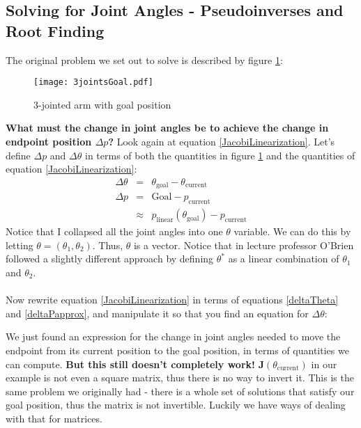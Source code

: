 \documentclass[]{article}
\begin{document}
\subsection{Solving for Joint Angles - Pseudoinverses and Root Finding}
The original problem we set out to solve is described by figure \ref{3jointarmGoal}:
\begin{figure}[htp]
    \centering
        \texttt{[image: 3jointsGoal.pdf]}
        \label{3jointarmGoal}
    \caption{3-jointed arm with goal position}
\end{figure}

\textbf{What must the change in joint angles be to achieve the change in endpoint position $\Delta p$?}
Look again at equation \ref{JacobiLinearization}. Let's define $\Delta p$ and $\Delta \theta$ in terms of both the quantities in figure \ref{3jointarmGoal} and the quantities of equation \ref{JacobiLinearization}:
\begin{eqnarray}
    \Delta \theta & = & \theta_{\text{goal}} - \theta_{\text{current}} \label{deltaTheta}\\ 
    \Delta p & = & \text{Goal} - p_\text{current} \label{deltaP}\\
     & \approx & p_{\text{linear}}(\theta_{\text{goal}}) - p_{\text{current}} \label{deltaPapprox}
\end{eqnarray}
Notice that I collapsed all the joint angles into one $\theta$ variable. We can do this by letting $\theta = \left( \theta_1, \theta_2\right)$. Thus, $\theta$ is a vector. Notice that in lecture professor O'Brien followed a slightly different approach by defining $\theta^*$ as a linear combination of $\theta_1$ and $\theta_2$.
\\
\\
Now rewrite equation \ref{JacobiLinearization} in terms of equations \ref{deltaTheta} and \ref{deltaPapprox}, and manipulate it so that you find an equation for $\Delta \theta$:
\vspace{2.5cm}
\vspace{2cm}

We just found an expression for the change in joint angles needed to move the endpoint from its current position to the goal position, in terms of quantities we can compute. \textbf{But this still doesn't completely work!} $\mathbf{J}(\theta_{\text{current}})$ in our example is not even a square matrix, thus there is no way to invert it. This is the same problem we originally had - there is a whole set of solutions that satisfy our goal position, thus the matrix is not invertible. Luckily we have ways of dealing with that for matrices.
\end{document}
